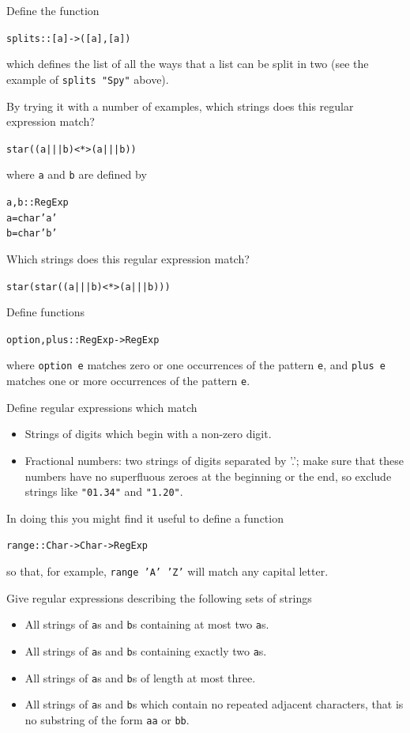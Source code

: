 \begin{exercises}

\item
Define the function
\begin{alltt}
splits :: [a] -> ([a],[a])
\end{alltt}
which defines the list of all the ways that a list can be split in two (see the example of \texttt{splits "Spy"} above).

\item
By trying it with a number of examples, which strings does this regular expression match?
\begin{alltt}
star ((a ||| b) <*> (a ||| b))
\end{alltt}
where \texttt{a} and \texttt{b} are defined by
\begin{alltt}
a, b :: RegExp
a = char 'a'
b = char 'b'
\end{alltt}

\item
Which strings does this regular expression match?
\begin{alltt}
star (star ((a ||| b) <*> (a ||| b)))
\end{alltt}
 
\item
Define functions
\begin{alltt}
option, plus :: RegExp -> RegExp
\end{alltt}
where \texttt{option e} matches zero or one occurrences of the pattern \texttt{e}, and \texttt{plus e} matches one or more occurrences of the pattern \texttt{e}.

\item
Define regular expressions which match 
\begin{itemize}
\item
Strings of digits which begin with a non-zero digit.
\item
Fractional numbers: two strings of digits separated by '.'; make sure that these numbers  have no superfluous zeroes at the beginning or the end, so exclude strings like \texttt{"01.34"} and \texttt{"1.20"}.
\end{itemize}
In doing this you might find it useful to define a function
\begin{alltt}
range :: Char -> Char -> RegExp
\end{alltt}
so that, for example, \texttt{range 'A' 'Z'} will match any capital letter. 

\item
Give regular expressions describing the following sets of strings
\begin{itemize}
\item All strings of {\tt a}s and {\tt b}s containing at most two {\tt a}s.
\item All strings of {\tt a}s and {\tt b}s containing exactly two {\tt a}s.
\item All strings of {\tt a}s and {\tt b}s of length at most three.
\item All strings of {\tt a}s and {\tt b}s which contain no repeated adjacent
characters, that is no substring of the form {\tt a{}a} or {\tt b{}b}.
\end{itemize}


\end{exercises}
